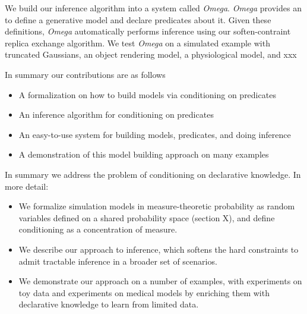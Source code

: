 We build our inference algorithm into a system called \emph{Omega}.
\emph{Omega} provides an to define a generative model and declare
predicates about it. Given these definitions, \emph{Omega} automatically
performs inference using our soften-contraint replica exchange algorithm.
We test \emph{Omega} on a simulated example with truncated Gaussians,
an object rendering model, a physiological model, and xxx 

In summary our contributions are as follows
\begin{itemize}
	\item A formalization on how to build models via conditioning on predicates
	\item An inference algorithm for conditioning on predicates
	\item An easy-to-use system for building models, predicates, and doing inference
	\item A demonstration of this model building approach on many examples
\end{itemize}



In summary we address the problem of conditioning on declarative knowledge.
In more detail:
\begin{itemize}
\item We formalize simulation models in measure-theoretic probability as random variables defined on a shared probability space (section X), and define conditioning as a concentration of measure.
\item We describe our approach to inference, which softens the hard constraints to admit tractable inference in a broader set of scenarios.
\item  We demonstrate our approach on a number of examples, with experiments on toy data and experiments on medical models by enriching them with declarative knowledge to learn from limited data.
\end{itemize}